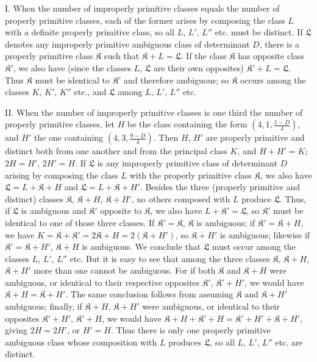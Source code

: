 I. When the number of improperly primitive classes equals the number of properly primitive classes, each of the former arises by composing the class $L$ with a definite properly primitive class, so all $L$, $L'$, $L''$ etc. must be distinct. If $\mathfrak{L}$ denotes any improperly primitive ambiguous class of determinant $D$, there is a properly primitive class $\mathfrak{K}$ such that $\mathfrak{K}+L=\mathfrak{L}$. If the class $\mathfrak{K}$ has opposite class $\mathfrak{K}'$, we also have (since the classes $L$, $\mathfrak{L}$ are their own opposites) $\mathfrak{K}'+L=\mathfrak{L}$. Thus $\mathfrak{K}$ must be identical to $\mathfrak{K}'$ and therefore ambiguous; so $\mathfrak{K}$ occurs among the classes $K$, $K'$, $K''$ etc., and $\mathfrak{L}$ among $L$, $L'$, $L''$ etc.

II. When the number of improperly primitive classes is one third the number of properly primitive classes, let $H$ be the class containing the form $\left(4,\allowbreak 1,\allowbreak \frac{1-D}{4}\right)$, and $H'$ the one containing $\left(4,\allowbreak 3,\allowbreak \frac{9-D}{4}\right)$. Then $H$, $H'$ are properly primitive and distinct both
from one another and from the principal class $K$, and $H+H'=K$; $2H=H'$, $2H'=H$. If $\mathfrak{L}$ is any improperly primitive class of determinant $D$ arising by composing the class $L$ with the properly primitive class $\mathfrak{K}$, we also have $\mathfrak{L}=L+\mathfrak{K}+H$ and $\mathfrak{L}=L+\mathfrak{K}+H'$. Besides the three (properly primitive and distinct) classes $\mathfrak{K}$, $\mathfrak{K}+H$, $\mathfrak{K}+H'$, no others composed with $L$ produce $\mathfrak{L}$. Thus, if $\mathfrak{L}$ is ambiguous and $\mathfrak{K}'$ opposite to $\mathfrak{K}$, we also have $L+\mathfrak{K}'=\mathfrak{L}$, so $\mathfrak{K}'$ must be identical to one of those three classes. If $\mathfrak{K}'=\mathfrak{K}$, $\mathfrak{K}$ is ambiguous; if $\mathfrak{K}'=\mathfrak{K}+H$, we have $K=\mathfrak{K}+\mathfrak{K}'=2\mathfrak{K}+H=2(\mathfrak{K}+H')$, so $\mathfrak{K}+H'$ is ambiguous; likewise if $\mathfrak{K}'=\mathfrak{K}+H'$, $\mathfrak{K}+H$ is ambiguous. We conclude that $\mathfrak{L}$ must occur among the classes $L$, $L'$, $L''$ etc. But it is easy to see that among the three classes $\mathfrak{K}$, $\mathfrak{K}+H$, $\mathfrak{K}+H'$ more than one cannot be ambiguous. For if both $\mathfrak{K}$ and $\mathfrak{K}+H$ were ambiguous, or identical to their respective opposites $\mathfrak{K}'$, $\mathfrak{K}'+H'$, we would have $\mathfrak{K}+H=\mathfrak{K}+H'$. The same conclusion follows from assuming $\mathfrak{K}$ and $\mathfrak{K}+H'$ ambiguous; finally, if $\mathfrak{K}+H$, $\mathfrak{K}+H'$ were ambiguous, or identical to their opposites $\mathfrak{K}'+H'$, $\mathfrak{K}'+H$, we would have $\mathfrak{K}+H+\mathfrak{K}'+H=\mathfrak{K}'+H'+\mathfrak{K}+H'$, giving $2H=2H'$, or $H'=H$. Thus there is only one properly primitive ambiguous class whose composition with $L$ produces $\mathfrak{L}$, so all $L$, $L'$, $L''$ etc. are distinct.

